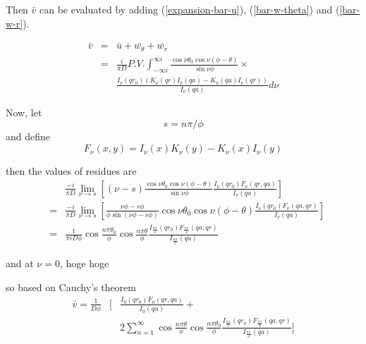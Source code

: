 \documentclass{article}
\begin{document}
Then $\bar{v}$ can be evaluated by adding 
(\ref{expansion-bar-u}), (\ref{bar-w-theta}) and (\ref{bar-w-r}).

\begin{eqnarray} 
    \bar{v} &=& \bar{u} + \bar{w_\theta} + \bar{w_r} \nonumber \\
            &=& \frac{i}{\pi D}P.V.\int^{\infty i}_{-\infty i}
                \frac{\cos\nu\theta_0\cos\nu(\phi - \theta)}{\sin\nu\phi}
                \times\nonumber\\
            & & \frac{I_\nu(qr_0)\left(K_\nu(qr)I_\nu(qa) - K_\nu(qa)I_\nu(qr)
                                 \right)}
                     {I_\nu(qa)}
                d\nu
    \label{bar-v}
\end{eqnarray}

Now, let
\begin{equation}
    s = n\pi / \phi
\end{equation}
and define
\begin{equation}
    F_\nu(x, y) = I_\nu(x)K_\nu(y) - K_\nu(x)I_\nu(y)
\end{equation}

then the values of residues are
\begin{eqnarray}
    & & \frac{-i}{\pi D}\lim_{\nu\to s}\left[
        (\nu - s)\frac{\cos\nu\theta_0\cos\nu(\phi - \theta)}{\sin\nu\phi}
                 \frac{I_\nu(qr_0)F_\nu(qr, qa)}{I_\nu(qa)}
        \right] \nonumber \\
    &=& \frac{-i}{\pi D}\lim_{\nu\to s}\left[
        \frac{\nu\phi - s\phi}{\phi\sin(\nu\phi-s\phi)}
        \cos\nu\theta_0\cos\nu(\phi - \theta)
        \frac{I_\nu(qr_0)F_\nu(qa, qr)}{I_\nu(qa)}
        \right] \nonumber \\
    &=& \frac{1}{\pi iD\phi}
        \cos\frac{n\pi\theta_0}{\phi}\cos\frac{n\pi\theta}{\phi}
        \frac{I_{\frac{n\pi}{\phi}}(qr_0)F_{\frac{n\pi}{\phi}}(qa, qr)}
        {I_{\frac{n\pi}{\phi}}(qa)}\nonumber
\end{eqnarray}

and at $\nu = 0$, hoge hoge

so based on Cauchy's theorem
\begin{eqnarray}
    \bar{v} = \frac{1}{D\phi}
      &\Biggl[& \frac{I_0(qr_0)F_0(qr, qa)}{I_0(qa)} + \nonumber\\
      &       & 2\sum^{\infty}_{n=1}
                \cos\frac{n\pi\theta}{\phi}\cos\frac{n\pi\theta_0}{\phi}
                \frac{I_{\frac{n\pi}{\phi}}(qr_0)F_{\frac{n\pi}{\phi}}(qa, qr)}
                {I_{\frac{n\pi}{\phi}}(qa)}\Biggr]
\end{eqnarray}
\end{document}
